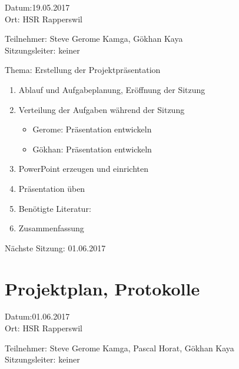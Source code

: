 Datum:19.05.2017\\

Ort: HSR Rapperswil

Teilnehmer: Steve Gerome Kamga, Gökhan Kaya\\

Sitzungsleiter: keiner

Thema: Erstellung der Projektpräsentation
\begin{enumerate}

\item Ablauf und Aufgabeplanung, Eröffnung der Sitzung 

\item  Verteilung der Aufgaben während der Sitzung
\begin{itemize}
\item Gerome: Präsentation entwickeln
\item Gökhan: Präsentation entwickeln
\end{itemize}

\item PowerPoint erzeugen und einrichten

\item Präsentation üben


\item Benötigte Literatur: 

\item Zusammenfassung

\end{enumerate}

Nächste Sitzung: 01.06.2017



\newpage
\section*{Projektplan, Protokolle}

Datum:01.06.2017\\
Ort: HSR Rapperswil

Teilnehmer: Steve Gerome Kamga, Pascal Horat, Gökhan Kaya\\
Sitzungsleiter: keiner

